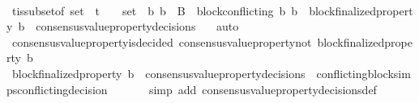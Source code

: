 \begin{isabellebody}
\ \ \ \ \ \isamarkupfalse%
\ {\isasymSigma}t{\isacharunderscore}is{\isacharunderscore}subset{\isacharunderscore}of{\isacharunderscore}{\isasymSigma}\ {\isacartoucheopen}{\isasymsigma}{\isacharunderscore}set\ {\isasymsubseteq}\ {\isasymSigma}t{\isacartoucheclose}\ {\isacartoucheopen}{\isacharbraceleft}{\isasymsigma}{\isacharcomma}\ {\isasymsigma}{\isacharprime}{\isacharbraceright}\ {\isasymsubseteq}\ {\isasymsigma}{\isacharunderscore}set\ {\isasymand}\ {\isacharbraceleft}b{}{\isacharcomma}\ b{}{\isacharbraceright}\ {\isasymsubseteq}\ B\ {\isasymand}\ block{\isacharunderscore}conflicting\ {\isacharparenleft}b{}{\isacharcomma}\ b{}{\isacharparenright}\ {\isasymand}\ block{\isacharunderscore}finalized{\isacharunderscore}property\ b{}\ {\isasymin}\ consensus{\isacharunderscore}value{\isacharunderscore}property{\isacharunderscore}decisions\ {\isasymsigma}{\isacartoucheclose}\ \isamarkupfalse%
\ auto\isanewline
\ \ \ \isamarkupfalse%
\ {\isachardoublequoteopen}consensus{\isacharunderscore}value{\isacharunderscore}property{\isacharunderscore}is{\isacharunderscore}decided\ {\isacharparenleft}consensus{\isacharunderscore}value{\isacharunderscore}property{\isacharunderscore}not\ {\isacharparenleft}block{\isacharunderscore}finalized{\isacharunderscore}property\ b{}{\isacharparenright}{\isacharcomma}\ {\isasymsigma}{\isacharprime}{\isacharparenright}{\isachardoublequoteclose}\isanewline
\ \ \ \ \ \isamarkupfalse%
\ {\isacartoucheopen}block{\isacharunderscore}finalized{\isacharunderscore}property\ b{}\ {\isasymin}\ consensus{\isacharunderscore}value{\isacharunderscore}property{\isacharunderscore}decisions\ {\isasymsigma}{\isacharprime}{\isacartoucheclose}\ conflicting{\isacharunderscore}blocks{\isacharunderscore}imps{\isacharunderscore}conflicting{\isacharunderscore}decision\isanewline
\ \ \ \ \ \isamarkupfalse%
\ {\isacharparenleft}simp\ add{\isacharcolon}\ consensus{\isacharunderscore}value{\isacharunderscore}property{\isacharunderscore}decisions{\isacharunderscore}def{\isacharparenright}\isanewline
\ \ \ \ \ \isamarkupfalse%

\end{isabellebody}
